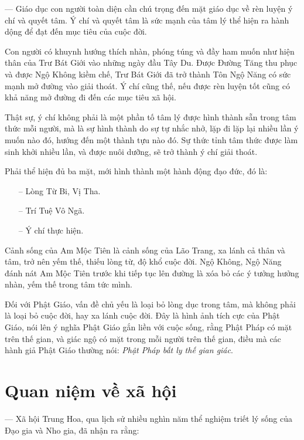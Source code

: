 — Giáo dục con người toàn diện cần chú trọng đến mặt giáo dục về rèn luyện ý chí và quyết tâm. Ý chí và quyết tâm là sức mạnh của tâm lý thể hiện ra hành dộng để đạt đến mục tiêu của cuộc đời.

Con người có khuynh hướng thích nhàn, phóng túng và đầy ham muốn như hiện thân của Trư Bát Giới vào những ngày đầu Tây Du. Được Đường Tăng thu phục và được Ngộ Không kiềm chế, Trư Bát Giới đã trở thành Tôn Ngộ Năng có sức mạnh mở đường vào giải thoát. Ý chí cũng thế, nếu được rèn luyện tốt cũng có khả năng mở đường đi đến các mục tiêu xã hội.

Thật sự, ý chí không phải là một phần tố tâm lý được hình thành sẵn trong tâm thức mỗi người, mà là sự hình thành do sự tự nhắc nhở, lặp đi lặp lại nhiều lần ý muốn nào đó, hướng đến một thành tựu nào đó. Sự thức tỉnh tâm thức được làm sinh khởi nhiều lần, và được nuôi dưỡng, sẽ trở thành ý chí giải thoát.

Phải thể hiện đủ ba mặt, mới hình thành một hành động đạo đức, đó là:

\begin{itemize}
    \item[–] Lòng Từ Bi, Vị Tha.
    \item[–] Trí Tuệ Vô Ngã.
    \item[–] Ý chí thực hiện.
\end{itemize}

Cảnh sống của Am Mộc Tiên là cảnh sống của Lão Trang, xa lánh cả thân và tâm, trở nên yếm thế, thiếu lòng từ, độ khổ cuộc đời. Ngộ Không, Ngộ Năng đánh nát Am Mộc Tiên trước khi tiếp tục lên đường là xóa bỏ các ý tưởng hưởng nhàn, yếm thế trong tâm tức mình.

Đối với Phật Giáo, vấn đề chủ yếu là loại bỏ lòng dục trong tâm, mà không phải là loại bỏ cuộc đời, hay xa lánh cuộc đời. Đây là hình ảnh tích cực của Phật Giáo, nói lên ý nghĩa Phật Giáo gắn liền với cuộc sống, rằng Phật Pháp có mặt trên thế gian, và giác ngộ có mặt trong mỗi người trên thế gian, điều mà các hành giả Phật Giáo thường nói: \emph{Phật Pháp bất ly thế gian giác}.

\section{Quan niệm về xã hội} %
\label{sec:64_xa_hoi}

— Xã hội Trung Hoa, qua lịch sử nhiều nghìn năm thể nghiệm triết lý sống của Đạo gia và Nho gia, đã nhận ra rằng:


